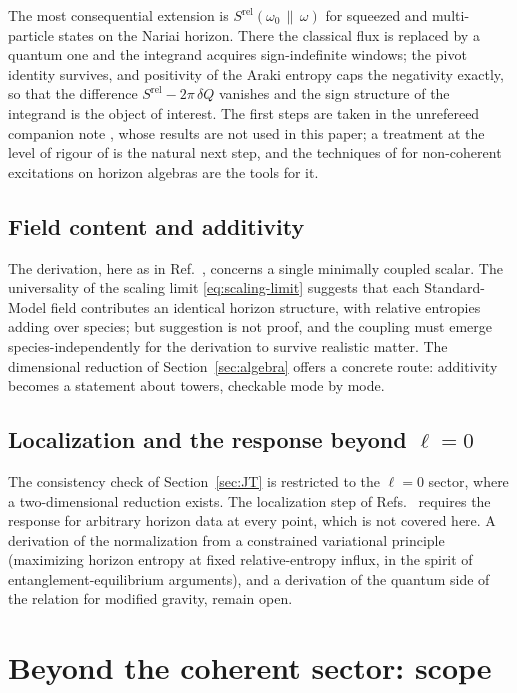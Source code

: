 \documentclass[11pt]{article}
\newcommand{\Srel}{S^{\mathrm{rel}}}
\newcommand{\Nariai}{Nariai}
\begin{document}
The most consequential extension is $\Srel(\omega_0\,\|\,\omega)$ for squeezed and multi-particle states on the \Nariai{} horizon. There the classical flux is replaced by a quantum one and the integrand acquires sign-indefinite windows; the pivot identity survives, and positivity of the Araki entropy caps the negativity exactly, so that the difference $\Srel - 2\pi\,\delta Q$ vanishes and the sign structure of the integrand is the object of interest. The first steps are taken in the unrefereed companion note \cite{SuppNariai}, whose results are not used in this paper; a treatment at the level of rigour of \cite{KPV} is the natural next step, and the techniques of \cite{Cadamuro} for non-coherent excitations on horizon algebras are the tools for it.

\subsection{Field content and additivity}

The derivation, here as in Ref.~\cite{DorauMuch}, concerns a single minimally coupled scalar. The universality of the scaling limit \eqref{eq:scaling-limit} suggests that each Standard-Model field contributes an identical horizon structure, with relative entropies adding over species; but suggestion is not proof, and the coupling must emerge species-independently for the derivation to survive realistic matter. The dimensional reduction of Section~\ref{sec:algebra} offers a concrete route: additivity becomes a statement about towers, checkable mode by mode.

\subsection{Localization and the response beyond $\ell=0$}

The consistency check of Section~\ref{sec:JT} is restricted to the $\ell=0$ sector, where a two-dimensional reduction exists. The localization step of Refs.~\cite{Jacobson,DorauMuch} requires the response for arbitrary horizon data at every point, which is not covered here. A derivation of the normalization from a constrained variational principle (maximizing horizon entropy at fixed relative-entropy influx, in the spirit of entanglement-equilibrium arguments), and a derivation of the quantum side of the relation for modified gravity, remain open.


\section{Beyond the coherent sector: scope}
\label{sec:scope}
\end{document}
